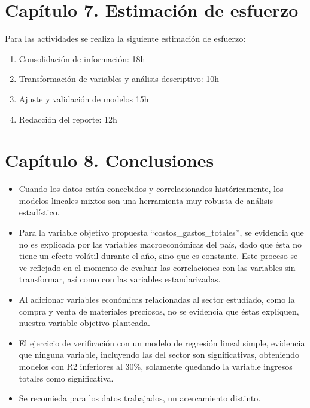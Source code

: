 \documentclass[
  11pt,
  a4paper,
]{book}
\providecommand{\tightlist}{%
  \setlength{\itemsep}{0pt}\setlength{\parskip}{0pt}}
\begin{document}
\hypertarget{capuxedtulo-7.-estimaciuxf3n-de-esfuerzo}{%
\chapter{Capítulo 7. Estimación de
esfuerzo}\label{capuxedtulo-7.-estimaciuxf3n-de-esfuerzo}}

Para las actividades se realiza la siguiente estimación de esfuerzo:

\begin{enumerate}
\def\labelenumi{\arabic{enumi})}
\tightlist
\item
  Consolidación de información: 18h
\item
  Transformación de variables y análisis descriptivo: 10h
\item
  Ajuste y validación de modelos 15h
\item
  Redacción del reporte: 12h
\end{enumerate}

\hypertarget{capuxedtulo-8.-conclusiones}{%
\chapter{Capítulo 8. Conclusiones}\label{capuxedtulo-8.-conclusiones}}

\begin{itemize}
\tightlist
\item
  Cuando los datos están concebidos y correlacionados históricamente,
  los modelos lineales mixtos son una herramienta muy robusta de
  análisis estadístico.
\item
  Para la variable objetivo propuesta ``costos\_gastos\_totales'', se
  evidencia que no es explicada por las variables macroeconómicas del
  país, dado que ésta no tiene un efecto volátil durante el año, sino
  que es constante. Este proceso se ve reflejado en el momento de
  evaluar las correlaciones con las variables sin transformar, así como
  con las variables estandarizadas.
\item
  Al adicionar variables económicas relacionadas al sector estudiado,
  como la compra y venta de materiales preciosos, no se evidencia que
  éstas expliquen, nuestra variable objetivo planteada.
\item
  El ejercicio de verificación con un modelo de regresión lineal simple,
  evidencia que ninguna variable, incluyendo las del sector son
  significativas, obteniendo modelos con R2 inferiores al 30\%,
  solamente quedando la variable ingresos totales como significativa.
\item
  Se recomieda para los datos trabajados, un acercamiento distinto.
\end{itemize}
\end{document}
